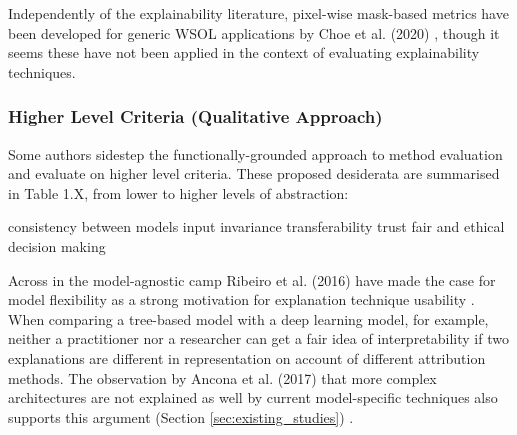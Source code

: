 \documentclass[main]{subfiles}
\begin{document}
Independently of the explainability literature, pixel-wise mask-based metrics have been developed for generic WSOL applications by Choe et al. (2020)  \cite{choe}, though it seems these have not been applied in the context of evaluating explainability techniques.

\subsubsection{Higher Level Criteria (Qualitative Approach)}

Some authors sidestep the functionally-grounded approach to method evaluation and evaluate on higher level criteria. These proposed desiderata are summarised in Table 1.X, from lower to higher levels of abstraction:

consistency between models
input invariance
transferability
trust
fair and ethical decision making

Across in the model-agnostic camp Ribeiro et al. (2016) have made the case for model flexibility as a strong motivation for explanation technique usability \cite{case_for_model_ag}. When comparing a tree-based model with a deep learning model, for example, neither a practitioner nor a researcher can get a fair idea of interpretability if two explanations are different in representation on account of different attribution methods. The observation by Ancona et al. (2017) that more complex architectures are not explained as well by current model-specific techniques also supports this argument (Section \ref{sec:existing_studies}) \cite{ancona}.








\end{document}
